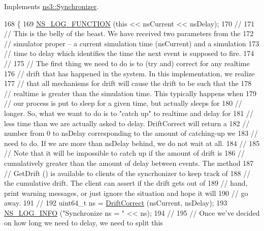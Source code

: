 Implements \hyperlink{classns3_1_1Synchronizer_a62f413ac3bb8335ecfa79ba899673055}{ns3\+::\+Synchronizer}.


\begin{DoxyCode}
168 \{
169   \hyperlink{log-macros-disabled_8h_a90b90d5bad1f39cb1b64923ea94c0761}{NS\_LOG\_FUNCTION} (\textcolor{keyword}{this} << nsCurrent << nsDelay);
170 \textcolor{comment}{//}
171 \textcolor{comment}{// This is the belly of the beast.  We have received two parameters from the}
172 \textcolor{comment}{// simulator proper -- a current simulation time (nsCurrent) and a simulation}
173 \textcolor{comment}{// time to delay which identifies the time the next event is supposed to fire.}
174 \textcolor{comment}{//}
175 \textcolor{comment}{// The first thing we need to do is to (try and) correct for any realtime }
176 \textcolor{comment}{// drift that has happened in the system.  In this implementation, we realize }
177 \textcolor{comment}{// that all mechanisms for drift will cause the drift to be such that the }
178 \textcolor{comment}{// realtime is greater than the simulation time.  This typically happens when }
179 \textcolor{comment}{// our process is put to sleep for a given time, but actually sleeps for}
180 \textcolor{comment}{// longer.  So, what we want to do is to "catch up" to realtime and delay for}
181 \textcolor{comment}{// less time than we are actually asked to delay.  DriftCorrect will return a }
182 \textcolor{comment}{// number from 0 to nsDelay corresponding to the amount of catching-up we}
183 \textcolor{comment}{// need to do.  If we are more than nsDelay behind, we do not wait at all.}
184 \textcolor{comment}{//}
185 \textcolor{comment}{// Note that it will be impossible to catch up if the amount of drift is }
186 \textcolor{comment}{// cumulatively greater than the amount of delay between events.  The method}
187 \textcolor{comment}{// GetDrift () is available to clients of the syncrhonizer to keep track of}
188 \textcolor{comment}{// the cumulative drift.  The client can assert if the drift gets out of }
189 \textcolor{comment}{// hand, print warning messages, or just ignore the situation and hope it will}
190 \textcolor{comment}{// go away.}
191 \textcolor{comment}{//}
192   uint64\_t ns = \hyperlink{classns3_1_1WallClockSynchronizer_af9eaa5c3014c416b69176fa2234aee90}{DriftCorrect} (nsCurrent, nsDelay);
193   \hyperlink{group__logging_gafbd73ee2cf9f26b319f49086d8e860fb}{NS\_LOG\_INFO} (\textcolor{stringliteral}{"Synchronize ns = "} << ns);
194 \textcolor{comment}{//}
195 \textcolor{comment}{// Once we've decided on how long we need to delay, we need to split this}

\end{DoxyCode}
